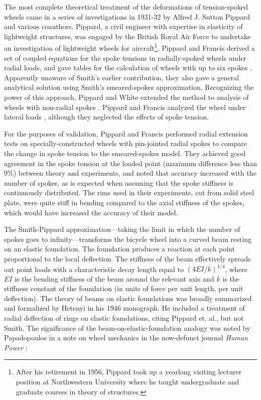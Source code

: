 \documentclass[../thesis.tex]{subfiles}
\begin{document}
The most complete theoretical treatment of the deformations of tension-spoked wheels came in a series of investigations in 1931-32 by Alfred J. Sutton Pippard and various coauthors. Pippard, a civil engineer with expertise in elasticity of lightweight structures, was engaged by the British Royal Air Force to undertake an investigation of lightweight wheels for aircraft\footnote{After his retirement in 1956, Pippard took up a yearlong visiting lecturer position at Northwestern University where he taught undergraduate and graduate courses in theory of structures.}. Pippard and Francis derived a set of coupled equations for the spoke tensions in radially-spoked wheels under radial loads, and gave tables for the calculation of wheels with up to six spokes \cite{Pippard1931}. Apparently unaware of Smith's earlier contribution, they also gave a general analytical solution using Smith's smeared-spokes approximation. Recognizing the power of this approach, Pippard and White extended the method to analysis of wheels with non-radial spokes \cite{Pippard1932b}. Pippard and Francis analyzed the wheel under lateral loads \cite{Pippard1932a}, although they neglected the effects of spoke tension.

For the purposes of validation, Pippard and Francis performed radial extension tests on specially-constructed wheels with pin-jointed radial spokes to compare the change in spoke tension to the smeared-spokes model. They achieved good agreement in the spoke tension at the loaded point (maximum difference less than 9\%) between theory and experiments, and noted that accuracy increased with the number of spokes, as is expected when assuming that the spoke stiffness is continuously distributed. The rims used in their experiments, cut from solid steel plate, were quite stiff in bending compared to the axial stiffness of the spokes, which would have increased the accuracy of their model.

The Smith-Pippard approximation---taking the limit in which the number of spokes goes to infinity---transforms the bicycle wheel into a curved beam resting on an elastic foundation. The foundation produces a reaction at each point proportional to the local deflection. The stiffness of the beam effectively spreads out point loads with a characteristic decay length equal to $(4EI/k)^{1/4}$, where $EI$ is the bending stiffness of the beam around the relevant axis and $k$ is the stiffness constant of the foundation (in units of force per unit length, per unit deflection). The theory of beams on elastic foundations was broadly summarized and formalized by Hetenyi \cite{Hetenyi1946} in his 1946 monograph. He included a treatment of radial deflection of rings on elastic foundations, citing Pippard et. al., but not Smith. The significance of the beam-on-elastic-foundation analogy was noted by Papadopoulos in a note on wheel mechanics in the now-defunct journal \emph{Human Power} \cite{Papadopoulos1986}:
\end{document}
